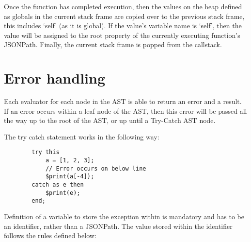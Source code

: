 Once the function has completed execution, then the values on the heap defined as globals in the current stack frame are copied over to the previous stack frame, this includes `self' (as it is global). If the value's variable name is `self', then the value will be assigned to the root property of the currently executing function's JSONPath. Finally, the current stack frame is popped from the callstack.

\section{Error handling}

Each evaluator for each node in the AST is able to return an error and a result. If an error occurs within a leaf node of the AST, then this error will be passed all the way up to the root of the AST, or up until a Try-Catch AST node.

\begin{center}
    The try catch statement works in the following way:
    \begin{verbatim}
        try this
            a = [1, 2, 3];
            // Error occurs on below line
            $print(a[-4]);
        catch as e then
            $print(e);
        end;
    \end{verbatim}
\end{center}

Definition of a variable to store the exception within is mandatory and has to be an identifier, rather than a JSONPath. The value stored within the identifier follows the rules defined below:

